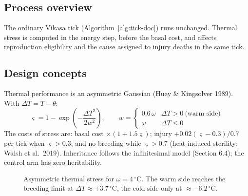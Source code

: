\subsection{Process overview}
The ordinary Vikasa tick (Algorithm~\ref{alg:tick-doc}) runs unchanged. Thermal
stress is computed in the energy step, before the basal cost, and affects
reproduction eligibility and the cause assigned to injury deaths in the same tick.

\subsection{Design concepts}
Thermal performance is an asymmetric Gaussian (Huey \& Kingsolver 1989). With
$\Delta T=T-\theta$:
\[
\varsigma=1-\exp\!\left(-\frac{\Delta T^2}{2w^2}\right),\qquad
w=\begin{cases}0.6\,\omega&\Delta T>0\ \text{(warm side)}\\ \omega&\Delta T\le0\end{cases}
\]
The costs of stress are: basal cost $\times(1+1.5\varsigma)$; injury
$+0.02(\varsigma-0.3)/0.7$ per tick when $\varsigma>0.3$; and no breeding while
$\varsigma>0.7$ (heat-induced sterility; Walsh et al.\ 2019). Inheritance follows
the infinitesimal model (Section 6.4); the control arm has zero heritability.

\begin{figure}[htbp]
\centering
{}
\caption{Asymmetric thermal stress for $\omega=4\,^{\circ}$C. The warm side
reaches the breeding limit at $\Delta T\approx+3.7\,^{\circ}$C, the cold side only
at $\approx-6.2\,^{\circ}$C.}
\end{figure}

